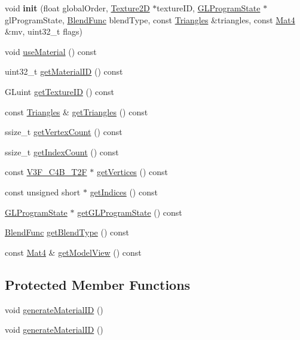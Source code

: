 \begin{DoxyCompactItemize}
\item 
\mbox{\label{classTrianglesCommand_a7d87d28f74ae5779b47e33f1c7e6e2e2}} 
void {\bfseries init} (float global\+Order, \hyperlink{classTexture2D}{Texture2D} $\ast$texture\+ID, \hyperlink{classGLProgramState}{G\+L\+Program\+State} $\ast$gl\+Program\+State, \hyperlink{structBlendFunc}{Blend\+Func} blend\+Type, const \hyperlink{structTrianglesCommand_1_1Triangles}{Triangles} \&triangles, const \hyperlink{classMat4}{Mat4} \&mv, uint32\+\_\+t flags)
\item 
void \hyperlink{classTrianglesCommand_ad55143235c591c8387090eac066f9993}{use\+Material} () const
\item 
uint32\+\_\+t \hyperlink{classTrianglesCommand_a3a2a112f8201abffa602503c5b612d36}{get\+Material\+ID} () const
\item 
G\+Luint \hyperlink{classTrianglesCommand_a0d523d41e7121d400395a1d30d97ded2}{get\+Texture\+ID} () const
\item 
const \hyperlink{structTrianglesCommand_1_1Triangles}{Triangles} \& \hyperlink{classTrianglesCommand_a6800ca337954a12e6ad0cf1f08ec0ec9}{get\+Triangles} () const
\item 
ssize\+\_\+t \hyperlink{classTrianglesCommand_aca1f762574af533898e639cfb480e2c5}{get\+Vertex\+Count} () const
\item 
ssize\+\_\+t \hyperlink{classTrianglesCommand_ac68263954d42221204fd80a3a20fa927}{get\+Index\+Count} () const
\item 
const \hyperlink{structV3F__C4B__T2F}{V3\+F\+\_\+\+C4\+B\+\_\+\+T2F} $\ast$ \hyperlink{classTrianglesCommand_af10bb83f4fe77a807446b06cd768d171}{get\+Vertices} () const
\item 
const unsigned short $\ast$ \hyperlink{classTrianglesCommand_a00f3fe880696bafdfc7ec8fc76e405b4}{get\+Indices} () const
\item 
\hyperlink{classGLProgramState}{G\+L\+Program\+State} $\ast$ \hyperlink{classTrianglesCommand_a1cf973a55b277ae0a81f3d10db1c0745}{get\+G\+L\+Program\+State} () const
\item 
\hyperlink{structBlendFunc}{Blend\+Func} \hyperlink{classTrianglesCommand_ad86f807326f056256e20ceba83a0a3d1}{get\+Blend\+Type} () const
\item 
const \hyperlink{classMat4}{Mat4} \& \hyperlink{classTrianglesCommand_a6f4d3d4f204b48b653e979d14c8b495f}{get\+Model\+View} () const
\end{DoxyCompactItemize}
\subsection*{Protected Member Functions}
\begin{DoxyCompactItemize}
\item 
void \hyperlink{classTrianglesCommand_a6d0ab0a07f123efd0073494bf8436db0}{generate\+Material\+ID} ()
\item 
void \hyperlink{classTrianglesCommand_a6d0ab0a07f123efd0073494bf8436db0}{generate\+Material\+ID} ()
\end{DoxyCompactItemize}
